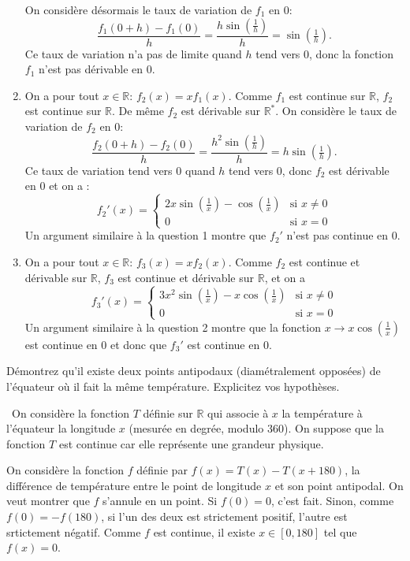 \documentclass[a4paper,12pt]{exam}
\begin{document}
\begin{questions}
\begin{solution}
\begin{enumerate}
  On considère désormais le taux de variation de $f_1$ en $0$:
  $$\frac{f_1(0+h)-f_1(0)}{h}=\frac{h\sin(\tfrac{1}{h})}{h}=\sin(\tfrac1h).$$
  Ce taux de variation n'a pas de limite quand $h$ tend vers 0, donc la fonction $f_1$ n'est pas dérivable en $0$. 
  \item On a pour tout $x\in\mathbb R$: $f_2(x)=xf_1(x)$. Comme $f_1$ est continue sur $\mathbb R$, $f_2$ est continue sur $\mathbb R$. De même $f_2$ est dérivable sur $\mathbb R^*$. On considère le taux de variation de $f_2$ en $0$:
  $$\frac{f_2(0+h)-f_2(0)}{h}=\frac{h^2\sin(\tfrac{1}{h})}{h}=h\sin(\tfrac1h).$$
  Ce taux de variation tend vers $0$ quand $h$ tend vers 0, donc $f_2$ est dérivable en $0$ et on a :
  $$f_2'(x)=\left\{\begin{array}{lc}2x \sin(\tfrac{1}{x})-\cos(\tfrac1x)&\text{si }x\neq 0\\0&\text{si }x=0\end{array}\right.$$
  Un argument similaire à la question 1 montre que $f_2'$ n'est pas continue en 0.
  \item On a pour tout $x\in\mathbb R$: $f_3(x)=xf_2(x)$. Comme $f_2$ est continue et dérivable sur $\mathbb R$, $f_3$ est continue et dérivable sur $\mathbb R$, et on a
  $$f_3'(x)=\left\{\begin{array}{lc}3x^2 \sin(\tfrac{1}{x})-x\cos(\tfrac1x)&\text{si }x\neq 0\\0&\text{si }x=0\end{array}\right.$$
  Un argument similaire à la question 2 montre que la fonction $x\rightarrow x\cos(\tfrac1x)$ est continue en $0$ et donc que $f_3'$ est continue en 0. 
 \end{enumerate}
 \end{solution}
 \question Démontrez qu'il existe deux points antipodaux (diamétralement opposées) de l'équateur où il fait la même température. Explicitez vos hypothèses.
 
 \begin{solution}\ 
  On considère la fonction $T$ définie sur $\mathbb R$ qui associe à $x$ la température à l'équateur la longitude $x$ (mesurée en degrée, modulo 360). On suppose que la fonction $T$ est continue car elle représente une grandeur physique.
  
  On considère la fonction $f$ définie par $f(x)=T(x)-T(x+180)$, la différence de température entre le point de longitude $x$ et son point antipodal. On veut montrer que $f$ s'annule en un point. Si $f(0)=0$, c'est fait. Sinon, comme $f(0)=-f(180)$, si l'un des deux est strictement positif, l'autre est srtictement négatif. Comme $f$ est continue, il existe $x\in[0,180]$ tel que $f(x)=0$.
 \end{solution}

 
\end{questions}
\end{document}
